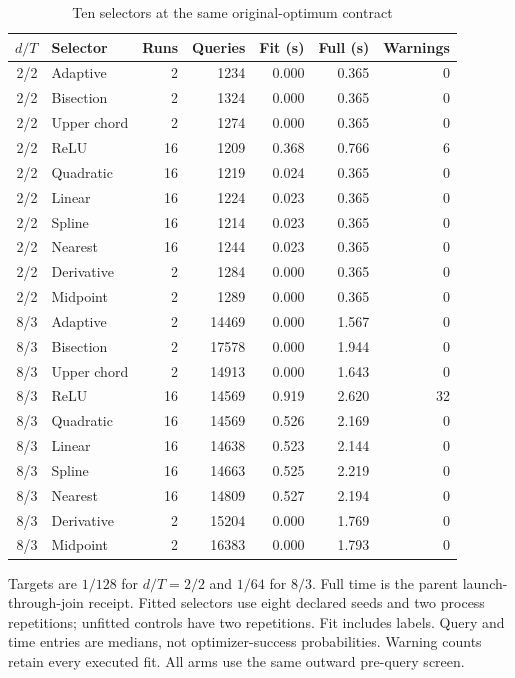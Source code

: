 \begin{table}[htbp]
\centering
\caption{Ten selectors at the same original-optimum contract}\label{tab:comparison67}
{\small\setlength{\tabcolsep}{4pt}
\begin{tabular}{rlrrrrr}
\toprule
$d/T$ & Selector & Runs & Queries & Fit (s) & Full (s) & Warnings \\
\midrule
2/2 & Adaptive & 2 & 1234 & 0.000 & 0.365 & 0 \\
2/2 & Bisection & 2 & 1324 & 0.000 & 0.365 & 0 \\
2/2 & Upper chord & 2 & 1274 & 0.000 & 0.365 & 0 \\
2/2 & ReLU & 16 & 1209 & 0.368 & 0.766 & 6 \\
2/2 & Quadratic & 16 & 1219 & 0.024 & 0.365 & 0 \\
2/2 & Linear & 16 & 1224 & 0.023 & 0.365 & 0 \\
2/2 & Spline & 16 & 1214 & 0.023 & 0.365 & 0 \\
2/2 & Nearest & 16 & 1244 & 0.023 & 0.365 & 0 \\
2/2 & Derivative & 2 & 1284 & 0.000 & 0.365 & 0 \\
2/2 & Midpoint & 2 & 1289 & 0.000 & 0.365 & 0 \\
8/3 & Adaptive & 2 & 14469 & 0.000 & 1.567 & 0 \\
8/3 & Bisection & 2 & 17578 & 0.000 & 1.944 & 0 \\
8/3 & Upper chord & 2 & 14913 & 0.000 & 1.643 & 0 \\
8/3 & ReLU & 16 & 14569 & 0.919 & 2.620 & 32 \\
8/3 & Quadratic & 16 & 14569 & 0.526 & 2.169 & 0 \\
8/3 & Linear & 16 & 14638 & 0.523 & 2.144 & 0 \\
8/3 & Spline & 16 & 14663 & 0.525 & 2.219 & 0 \\
8/3 & Nearest & 16 & 14809 & 0.527 & 2.194 & 0 \\
8/3 & Derivative & 2 & 15204 & 0.000 & 1.769 & 0 \\
8/3 & Midpoint & 2 & 16383 & 0.000 & 1.793 & 0 \\
\bottomrule
\end{tabular}}
\par\smallskip
{\footnotesize Targets are $1/128$ for $d/T=2/2$ and $1/64$ for $8/3$. Full time is the parent launch-through-join receipt. Fitted selectors use eight declared seeds and two process repetitions; unfitted controls have two repetitions. Fit includes labels. Query and time entries are medians, not optimizer-success probabilities. Warning counts retain every executed fit. All arms use the same outward pre-query screen.}
\end{table}
